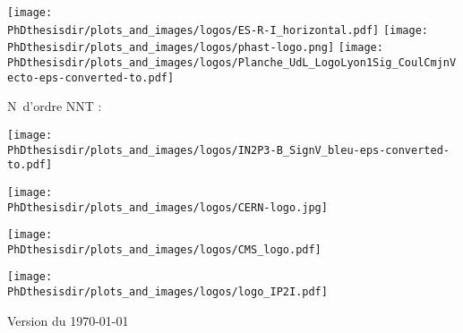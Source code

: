 \thispagestyle{empty}
\begin{center}
\large

\texttt{[image: \\PhDthesisdir/plots\_and\_images/logos/ES-R-I\_horizontal.pdf]}
\hfill
\texttt{[image: \\PhDthesisdir/plots\_and\_images/logos/phast-logo.png]}
\hfill
\texttt{[image: \\PhDthesisdir/plots\_and\_images/logos/Planche\_UdL\_LogoLyon1Sig\_CoulCmjnVecto-eps-converted-to.pdf]}

\vspace{1cm}

\begin{flushleft}
N\degree\ d'ordre NNT : \NordreNNT%
\end{flushleft}
\vspace{\baselineskip}



\vfill

\begin{minipage}[t]{.225\textwidth}
\begin{center}
\texttt{[image: \\PhDthesisdir/plots\_and\_images/logos/IN2P3-B\_SignV\_bleu-eps-converted-to.pdf]}
\end{center}
\end{minipage}
\hfill
\begin{minipage}[t]{.225\textwidth}
\begin{center}
\texttt{[image: \\PhDthesisdir/plots\_and\_images/logos/CERN-logo.jpg]}
\end{center}
\end{minipage}
\hfill
\begin{minipage}[t]{.225\textwidth}
\begin{center}
\texttt{[image: \\PhDthesisdir/plots\_and\_images/logos/CMS\_logo.pdf]}
\end{center}
\end{minipage}
\hfill
\begin{minipage}[t]{.225\textwidth}
\begin{center}
\texttt{[image: \\PhDthesisdir/plots\_and\_images/logos/logo\_IP2I.pdf]}
\end{center}
\end{minipage}

\vspace{.25cm}

{\scriptsize Version du \today}

\vspace{-1cm}
\end{center}